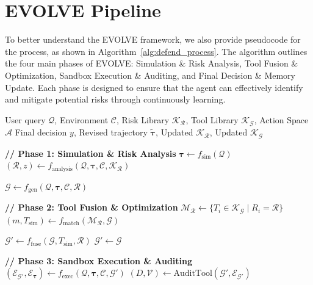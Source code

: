 \section{EVOLVE Pipeline}
\label{appendix:pipeline}
To better understand the EVOLVE framework, we also provide pseudocode for the process, as shown in Algorithm~\ref{alg:defend_process}. The algorithm outlines the four main phases of EVOLVE: Simulation \& Risk Analysis, Tool Fusion \& Optimization, Sandbox Execution \& Auditing, and Final Decision \& Memory Update. Each phase is designed to ensure that the agent can effectively identify and mitigate potential risks through continuously learning.
\begin{algorithm}[t]
\caption{The EVOLVE Framework Process}
\label{alg:defend_process}
\begin{algorithmic}[1]
\Require User query $\mathcal{Q}$, Environment $\mathcal{C}$, Risk Library $\mathcal{K_R}$, Tool Library $\mathcal{K_G}$, Action Space $\mathcal{A}$
\Ensure Final decision $y$, Revised trajectory $\tilde{\boldsymbol{\tau}}$, Updated $\mathcal{K_R}$, Updated $\mathcal{K_G}$

\State \textbf{// Phase 1: Simulation \& Risk Analysis}
\State $\boldsymbol{\tau} \gets f_{\mathrm{sim}}(\mathcal{Q})$ 
\State $(\mathcal{R}, z) \gets f_{\mathrm{analysis}}(\mathcal{Q}, \boldsymbol{\tau}, \mathcal{C}, \mathcal{K_R})$ 

    \State $\mathcal{G} \gets f_{\mathrm{gen}}(\mathcal{Q}, \boldsymbol{\tau}, \mathcal{C}, \mathcal{R})$ 

    \State \textbf{// Phase 2: Tool Fusion \& Optimization}
    \State $\mathcal{M_R} \gets \{ T_i \in \mathcal{K_G} \mid R_i = \mathcal{R} \}$ 
    \State $(m, T_{\text{sim}}) \gets f_{\mathrm{match}}(\mathcal{M_R}, \mathcal{G})$ 

        \State $\mathcal{G}' \gets f_{\mathrm{fuse}}(\mathcal{G}, T_{\text{sim}}, \mathcal{R})$ 
    \Else
        \State $\mathcal{G}' \gets \mathcal{G}$
    \EndIf
\EndIf

\State \textbf{// Phase 3: Sandbox Execution \& Auditing}
\State $(\mathcal{E}_{\mathcal{G}'}, \mathcal{E}_{\boldsymbol{\tau}}) \gets f_{\mathrm{exec}}(\mathcal{Q}, \boldsymbol{\tau}, \mathcal{C}, \mathcal{G}')$ 
\State $(D, \mathcal{V}) \gets \text{AuditTool}(\mathcal{G}', \mathcal{E}_{\mathcal{G}'})$ 


\end{algorithmic}
\end{algorithm}
